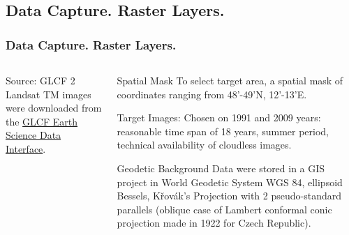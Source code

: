 \documentclass[pdflatex,compress,8pt,
	xcolor={dvipsnames,dvipsnames,svgnames,x11names,table},
	hyperref={
	breaklinks = true, 
	pdfauthor={Lemenkova Polina}, 
	pdfsubject={Preentation}, 
	pdfcreator={Lemenkova Polina}, 
	pdfproducer={Lemenkova Polina}, 
	colorlinks=true,linkcolor=blue, 
	citecolor=NavyBlue, 
	urlcolor = NavyBlue, 
	breaklinks = true}]{beamer}
\begin{document}
\subsection{Data Capture. Raster Layers.}
\begin{frame}\frametitle{ Data Capture. Raster Layers.}

\begin{minipage}[0.4\textheight]{\textwidth}
\begin{columns}[T]
\begin{column}{0.6\textwidth}
\vspace{1em}
\begin{figure}[H]
	\centering
			\vspace{2mm}
\end{figure}

\begin{alertblock}{Source: GLCF}
2 Landsat TM images were downloaded from the \href{http://glcfapp.glcf.umd.edu}{GLCF Earth Science Data Interface}.
\end{alertblock}

\end{column}
\begin{column}{0.4\textwidth}
\vspace{2em} 

\begin{block}{Spatial Mask}
To select target area, a spatial mask of coordinates ranging from 48’-49’N, 12’-13’E.
\end{block}

\begin{examples}{Target Images:}
Chosen on 1991 and 2009 years: reasonable time span of 18 years, summer period, technical availability of cloudless images.
\end{examples}

\begin{block}{Geodetic Background}
Data were stored in a GIS project in World Geodetic System WGS 84, ellipsoid Bessels, Křovák's Projection with 2 pseudo-standard parallels (oblique case of Lambert conformal conic projection made in 1922 for Czech Republic).
\end{block}

\end{column}
\end{columns}
\end{minipage}
\end{frame}
\end{document}
